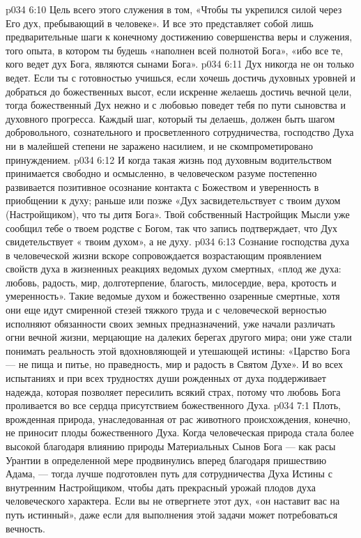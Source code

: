 \vs p034 6:10 Цель всего этого служения в том, «Чтобы ты укрепился силой через Его дух, пребывающий в человеке». И все это представляет собой лишь предварительные шаги к конечному достижению совершенства веры и служения, того опыта, в котором ты будешь «наполнен всей полнотой Бога», «ибо все те, кого ведет дух Бога, являются сынами Бога».
\vs p034 6:11 \pc Дух никогда не  он только ведет. Если ты с готовностью учишься, если хочешь достичь духовных уровней и добраться до божественных высот, если искренне желаешь достичь вечной цели, тогда божественный Дух нежно и с любовью поведет тебя по пути сыновства и духовного прогресса. Каждый шаг, который ты делаешь, должен быть шагом добровольного, сознательного и просветленного сотрудничества, господство Духа ни в малейшей степени не заражено насилием, и не скомпрометировано принуждением.
\vs p034 6:12 И когда такая жизнь под духовным водительством принимается свободно и осмысленно, в человеческом разуме постепенно развивается позитивное осознание контакта с Божеством и уверенность в приобщении к духу; раньше или позже «Дух засвидетельствует с твоим духом (Настройщиком), что ты дитя Бога». Твой собственный Настройщик Мысли уже сообщил тебе о твоем родстве с Богом, так что запись подтверждает, что Дух свидетельствует « твоим духом», а не  духу.
\vs p034 6:13 Сознание господства духа в человеческой жизни вскоре сопровождается возрастающим проявлением свойств духа в жизненных реакциях ведомых духом смертных, «плод же духа: любовь, радость, мир, долготерпение, благость, милосердие, вера, кротость и умеренность». Такие ведомые духом и божественно озаренные смертные, хотя они еще идут смиренной стезей тяжкого труда и с человеческой верностью исполняют обязанности своих земных предназначений, уже начали различать огни вечной жизни, мерцающие на далеких берегах другого мира; они уже стали понимать реальность этой вдохновляющей и утешающей истины: «Царство Бога --- не пища и питье, но праведность, мир и радость в Святом Духе». И во всех испытаниях и при всех трудностях души рожденных от духа поддерживает надежда, которая позволяет пересилить всякий страх, потому что любовь Бога проливается во все сердца присутствием божественного Духа.
\vs p034 7:1 Плоть, врожденная природа, унаследованная от рас животного происхождения, конечно, не приносит плоды божественного Духа. Когда человеческая природа стала более высокой благодаря влиянию природы Материальных Сынов Бога --- как расы Урантии в определенной мере продвинулись вперед благодаря пришествию Адама, --- тогда лучше подготовлен путь для сотрудничества Духа Истины с внутренним Настройщиком, чтобы дать прекрасный урожай плодов духа человеческого характера. Если вы не отвергнете этот дух, «он наставит вас на путь истинный», даже если для выполнения этой задачи может потребоваться вечность.

